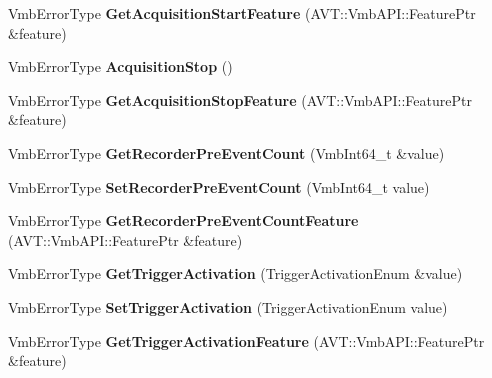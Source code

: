 \begin{DoxyCompactItemize}
\item 
\hypertarget{classMakoCamera_a219cdb96910c477d2552017c9c09537f}{Vmb\-Error\-Type {\bfseries Get\-Acquisition\-Start\-Feature} (A\-V\-T\-::\-Vmb\-A\-P\-I\-::\-Feature\-Ptr \&feature)}\label{classMakoCamera_a219cdb96910c477d2552017c9c09537f}

\item 
\hypertarget{classMakoCamera_a7cee671ef7610fdc8bdc73443e882d2e}{Vmb\-Error\-Type {\bfseries Acquisition\-Stop} ()}\label{classMakoCamera_a7cee671ef7610fdc8bdc73443e882d2e}

\item 
\hypertarget{classMakoCamera_af07b6714edd5e10ab497ea78caabb56d}{Vmb\-Error\-Type {\bfseries Get\-Acquisition\-Stop\-Feature} (A\-V\-T\-::\-Vmb\-A\-P\-I\-::\-Feature\-Ptr \&feature)}\label{classMakoCamera_af07b6714edd5e10ab497ea78caabb56d}

\item 
\hypertarget{classMakoCamera_a548742bab59830c09e7ac968e42105df}{Vmb\-Error\-Type {\bfseries Get\-Recorder\-Pre\-Event\-Count} (Vmb\-Int64\-\_\-t \&value)}\label{classMakoCamera_a548742bab59830c09e7ac968e42105df}

\item 
\hypertarget{classMakoCamera_afc1cfe0621b49caf77b95fe1b2439191}{Vmb\-Error\-Type {\bfseries Set\-Recorder\-Pre\-Event\-Count} (Vmb\-Int64\-\_\-t value)}\label{classMakoCamera_afc1cfe0621b49caf77b95fe1b2439191}

\item 
\hypertarget{classMakoCamera_aff2d02ae96e3560e7964464bf42745cd}{Vmb\-Error\-Type {\bfseries Get\-Recorder\-Pre\-Event\-Count\-Feature} (A\-V\-T\-::\-Vmb\-A\-P\-I\-::\-Feature\-Ptr \&feature)}\label{classMakoCamera_aff2d02ae96e3560e7964464bf42745cd}

\item 
\hypertarget{classMakoCamera_a341b4741ec294514f6955fd65a1e9921}{Vmb\-Error\-Type {\bfseries Get\-Trigger\-Activation} (Trigger\-Activation\-Enum \&value)}\label{classMakoCamera_a341b4741ec294514f6955fd65a1e9921}

\item 
\hypertarget{classMakoCamera_a889212d1842d89ebbc75cb211a521ded}{Vmb\-Error\-Type {\bfseries Set\-Trigger\-Activation} (Trigger\-Activation\-Enum value)}\label{classMakoCamera_a889212d1842d89ebbc75cb211a521ded}

\item 
\hypertarget{classMakoCamera_a0c9564c209a07c0cf92ed69d56e5cc77}{Vmb\-Error\-Type {\bfseries Get\-Trigger\-Activation\-Feature} (A\-V\-T\-::\-Vmb\-A\-P\-I\-::\-Feature\-Ptr \&feature)}\label{classMakoCamera_a0c9564c209a07c0cf92ed69d56e5cc77}


\end{DoxyCompactItemize}
